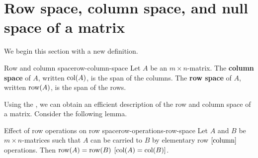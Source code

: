 \section{Row space, column space, and null space of a matrix}

We begin this section with a new definition.

\begin{definition}{Row and column space}{row-column-space}
Let $A$ be an $m\times n$-matrix. The \textbf{column space} of $A$, written $\mbox{\rm col}(A)$, is the
span of the columns. The \textbf{row space} of $A$, written $\mbox{\rm row}(A)$, is the span of the rows.
\end{definition}

Using the {\rref}, we can obtain an efficient description of the row and column space of
a matrix. Consider the following lemma.

\begin{lemma}{Effect of row operations on row space}{row-operations-row-space}
Let $A$ and $B$ be $m\times n$-matrices such that $A$ can be carried to $B$ by elementary row $\left[\mbox{column}\right]$ operations. Then $\mbox{\rm row}(A)=\mbox{\rm row}(B)$ $\left[\mbox{\rm col}(A)=\mbox{\rm col}(B)\right]$.
\end{lemma}

